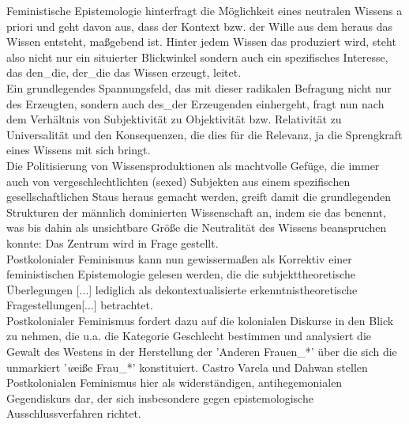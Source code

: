 \noindent Feministische Epistemologie hinterfragt die Möglichkeit eines neutralen Wissens
a priori und geht davon aus, dass der Kontext bzw. der Wille aus dem heraus das
Wissen entsteht, maßgebend ist. Hinter jedem Wissen das produziert wird, steht
also nicht nur ein situierter Blickwinkel sondern auch ein spezifisches
Interesse, das den\_die, der\_die das Wissen erzeugt, leitet.\\
 Ein grundlegendes
Spannungsfeld, das mit dieser radikalen Befragung nicht nur des Erzeugten,
sondern auch des\_der Erzeugenden einhergeht, fragt nun nach dem Verhältnis von
Subjektivität zu Objektivität bzw. Relativität zu Universalität und den
Konsequenzen, die dies für die Relevanz, ja die Sprengkraft eines Wissens mit
sich bringt.\footnotemark {} \\
Die Politisierung von Wissensproduktionen als machtvolle Gefüge,
die immer auch von vergeschlechtlichten (sexed) Subjekten aus einem
spezifischen gesellschaftlichen Staus heraus gemacht werden, greift damit die
grundlegenden Strukturen der männlich dominierten Wissenschaft an, indem sie
das benennt, was bis dahin als unsichtbare Größe die Neutralität des Wissens
beanspruchen konnte: Das Zentrum wird in Frage gestellt.\footnotemark
{}\\

\noindent Postkolonialer Feminismus kann nun gewissermaßen als Korrektiv einer
feministischen Epistemologie gelesen werden, die die \glqq subjekttheoretische
Überlegungen [...] lediglich als dekontextualisierte erkenntnistheoretische
Fragestellungen[...] \grqq \footnotemark {} betrachtet. \\
Postkolonialer Feminismus fordert dazu auf die kolonialen
Diskurse in den Blick zu nehmen, die u.a. die Kategorie Geschlecht bestimmen
und \glqq analysiert die Gewalt des Westens \grqq \footnotemark
{} in der Herstellung der 'Anderen
Frauen\_*' über die sich die unmarkiert '\textit{w}eiße Frau\_*' konstituiert.
Castro Varela und Dahwan stellen Postkolonialen Feminismus hier als
\glqq widerständigen, antihegemonialen Gegendiskurs dar, der sich insbesondere gegen
epistemologische Ausschlussverfahren richtet.\grqq \footnotemark
{}\\

